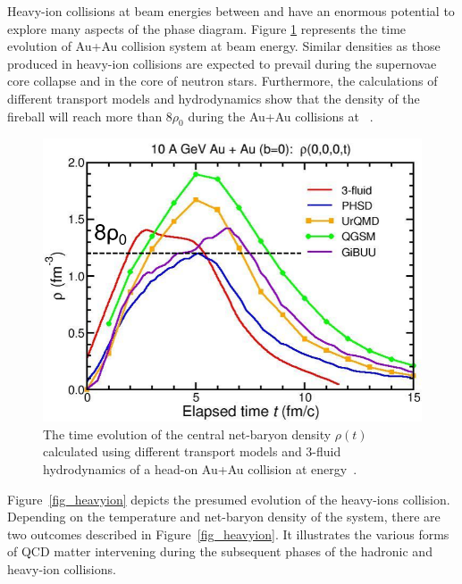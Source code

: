 Heavy-ion collisions at beam energies between  and  have an enormous potential to explore many aspects of the phase diagram. Figure \ref{fig:cbm_density} represents the time evolution of Au+Au collision system at  beam energy. Similar densities as those produced in heavy-ion collisions are expected to prevail during the supernovae core collapse and in the core of neutron stars. Furthermore, the calculations of different transport models and hydrodynamics show that the density of the fireball will reach more than $8\rho_{0}$ during the Au+Au collisions at ~\cite{CBM_physics}.

\begin{figure}[!h]
    \centering
    \includegraphics[width=0.65\columnwidth]{Chapter1/images/CBM_density.png}
    \caption{The time evolution of the central net-baryon density $\rho(t)$ calculated using different transport models and 3-fluid hydrodynamics of a head-on Au+Au collision at  energy~\cite{CBM_physics}.}
    \label{fig:cbm_density}
\end{figure}

Figure~\ref{fig_heavyion} depicts the presumed evolution of the heavy-ions collision. Depending on the temperature and net-baryon density of the system, there are two outcomes described in Figure~\ref{fig_heavyion}. It illustrates the various forms of QCD matter intervening during the subsequent phases of the hadronic and heavy-ion collisions.

